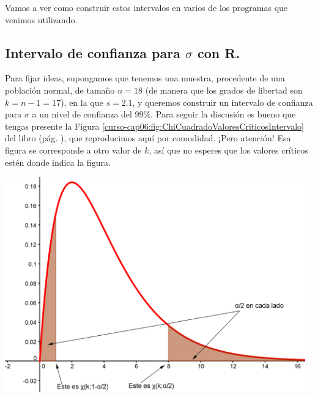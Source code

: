 \documentclass[10pt,a4paper]{article}\usepackage[]{graphicx}\usepackage[]{color}
\begin{document}
Vamos a ver como construir estos intervalos en varios de los programas que venimos utilizando.

\subsection{Intervalo de confianza para $\sigma$ con R.}
\label{tut06:subsec:IntConfSIgmaConR}

Para fijar ideas, supongamos que tenemos una muestra, procedente de una población normal, de tamaño $n=18$ (de manera que los grados de libertad son $k=n-1=17$), en la que  $s= 2.1$, y queremos construir un intervalo de confianza para $\sigma$ a un nivel de confianza del $99\%$.  Para seguir la discusión es bueno que tengas presente la Figura \ref{curso-cap06:fig:ChiCuadradoValoresCriticosIntervalo} del libro (pág. \pageref{curso-cap06:fig:ChiCuadradoValoresCriticosIntervalo}), que reproducimos aquí por comodidad. ¡Pero atención! Esa figura se corresponde a otro valor de $k$, así que no esperes que los valores críticos estén donde indica la figura.

\begin{center}
\includegraphics[width=13cm]{../fig/Cap06-ChiCuadradoValoresCriticosIntervalo.png}
\end{center}
\end{document}
